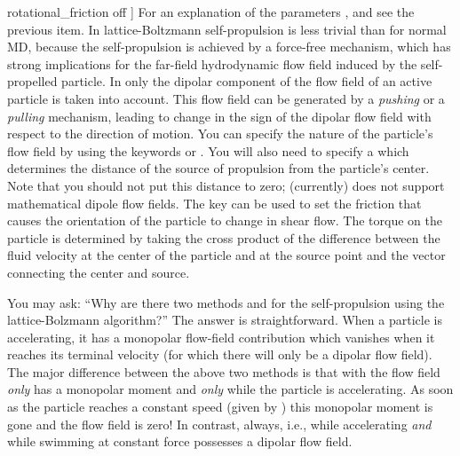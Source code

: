 \begin{arguments}
{{{{          rotational_friction  \asep off}%
      }}}] For an explanation of the parameters ,
   and  see the previous item. In
  lattice-Boltzmann self-propulsion is less trivial than for normal
  MD, because the self-propulsion is achieved by a force-free
  mechanism, which has strong implications for the far-field
  hydrodynamic flow field induced by the self-propelled particle. In
  \es{} only the dipolar component of the flow field of an active
  particle is taken into account. This flow field can be generated by
  a \emph{pushing} or a \emph{pulling} mechanism, leading to change in
  the sign of the dipolar flow field with respect to the direction of
  motion. You can specify the nature of the particle's flow field by
  using the keywords  or . You will
  also need to specify a  which determines the
  distance of the source of propulsion from the particle's
  center. Note that you should not put this distance to zero; \es{}
  (currently) does not support mathematical dipole flow fields. The
  key  can be used to set the friction
  that causes the orientation of the particle to change in shear
  flow. The torque on the particle is determined by taking the cross
  product of the difference between the fluid velocity at the center
  of the particle and at the source point and the vector connecting
  the center and source.

  \noindent
  You may ask: ``Why are there two methods  and
   for the self-propulsion using the lattice-Bolzmann
  algorithm?'' The answer is straightforward. When a particle is
  accelerating, it has a monopolar flow-field contribution which
  vanishes when it reaches its terminal velocity (for which there will
  only be a dipolar flow field). The major difference between the
  above two methods is that with  the flow field
  \emph{only} has a monopolar moment and \emph{only} while the
  particle is accelerating. As soon as the particle reaches a constant
  speed (given by ) this monopolar moment is gone and the
  flow field is zero! In contrast,  always, i.e., while
  accelerating \emph{and} while swimming at constant force possesses a
  dipolar flow field.

  \noindent
\end{arguments}

